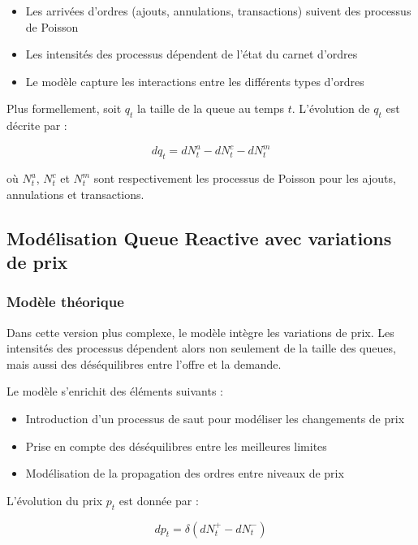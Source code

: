 \documentclass[12pt,a4paper]{article}
\theoremstyle{definition}
\theoremstyle{remark}
\begin{document}
\begin{itemize}
    \item Les arrivées d'ordres (ajouts, annulations, transactions) suivent des processus de Poisson
    \item Les intensités des processus dépendent de l'état du carnet d'ordres
    \item Le modèle capture les interactions entre les différents types d'ordres
\end{itemize}

Plus formellement, soit $q_t$ la taille de la queue au temps $t$. L'évolution de $q_t$ est décrite par :

\begin{equation}
    dq_t = dN_t^a - dN_t^c - dN_t^m
\end{equation}

où $N_t^a$, $N_t^c$ et $N_t^m$ sont respectivement les processus de Poisson pour les ajouts, annulations et transactions.

\subsection{Modélisation Queue Reactive avec variations de prix}

\subsubsection{Modèle théorique}

Dans cette version plus complexe, le modèle intègre les variations de prix. Les intensités des processus dépendent alors non seulement de la taille des queues, mais aussi des déséquilibres entre l'offre et la demande.

Le modèle s'enrichit des éléments suivants :

\begin{itemize}
    \item Introduction d'un processus de saut pour modéliser les changements de prix
    \item Prise en compte des déséquilibres entre les meilleures limites
    \item Modélisation de la propagation des ordres entre niveaux de prix
\end{itemize}

L'évolution du prix $p_t$ est donnée par :

\begin{equation}
    dp_t = \delta(dN_t^+ - dN_t^-)
\end{equation}
\end{document}
